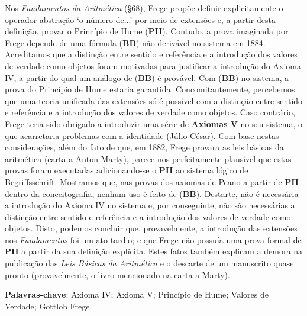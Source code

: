 \documentclass[12pt]{abntex2}
\begin{document}
\tableofcontents


\begin{resumo}
Nos \textit{Fundamentos da Aritmética} (§68), Frege propõe definir explicitamente o operador-abstração `o número de...' por meio de extensões e, a partir desta definição, provar o Princípio de Hume (\textbf{PH}). Contudo, a prova imaginada por Frege depende de uma fórmula (\textbf{BB}) não derivável no sistema em 1884. Acreditamos que a distinção entre sentido e referência e a introdução dos valores de verdade como objetos foram motivadas para justificar a introdução do Axioma IV, a partir do qual um análogo de (\textbf{BB}) é provável. Com (\textbf{BB}) no sistema, a prova do Princípio de Hume estaria garantida. Concomitantemente, percebemos que uma teoria unificada das extensões só é possível com a distinção entre sentido e referência e a introdução dos valores de verdade como objetos. Caso contrário, Frege teria sido obrigado a introduzir uma série de \textbf{Axiomas V} no seu sistema, o que acarretaria problemas com a identidade (Júlio César). Com base nestas considerações, além do fato de que, em 1882, Frege provara as leis básicas da aritmética (carta a Anton Marty), parece-nos perfeitamente plausível que estas provas foram executadas adicionando-se o \textbf{PH} ao sistema lógico de Begriffsschrift. Mostramos que, nas provas dos axiomas de Peano a partir de \textbf{PH} dentro da conceitografia, nenhum uso é feito de (\textbf{BB}). Destarte, não é necessária a introdução do Axioma IV no sistema e, por conseguinte, não são necessárias a distinção entre sentido e referência e a introdução dos valores de verdade como objetos. Disto, podemos concluir que, provavelmente, a introdução das extensões nos \textit{Fundamentos} foi um ato tardio; e que Frege não possuía uma prova formal de \textbf{PH} a partir da sua definição explícita. Estes fatos também explicam a demora na publicação das \textit{Leis Básicas da Aritmética} e o descarte de um manuscrito quase pronto (provavelmente, o livro mencionado na carta a Marty). 
\vspace{\onelineskip} 
\noindent
\par
\textbf{Palavras-chave}: Axioma IV; Axioma V; Princípio de Hume; Valores de Verdade; Gottlob Frege. 
\end{resumo}
\end{document}
